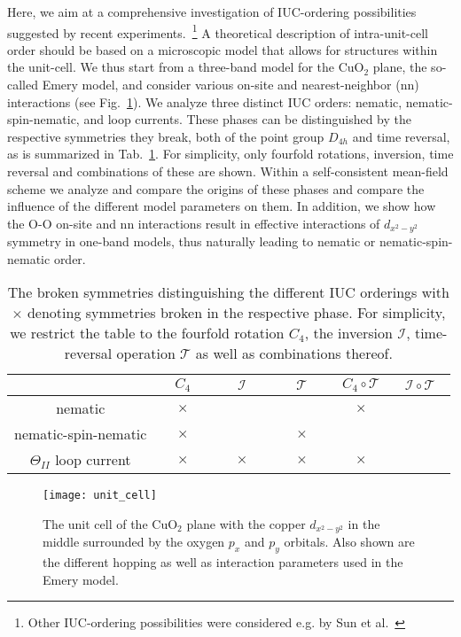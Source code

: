 \documentclass[prb, twocolumn,showpacs,preprintnumbers,amsmath,amssymb, floatfix]{revtex4}
\begin{document}
Here, we aim at a comprehensive investigation of IUC-ordering
possibilities suggested by recent experiments.~\footnote{Other IUC-ordering possibilities were considered e.g. by Sun et al.~\cite{sun:2008}}
A theoretical description of intra-unit-cell order
should be based on a microscopic model
that allows for structures within the unit-cell.
We thus start from a three-band model for the CuO$_2$ plane, the so-called Emery
model\cite{emery:1987}, and consider various on-site and nearest-neighbor (nn) interactions
(see Fig.~\ref{fig:unitcell}).
We analyze three
distinct IUC orders: nematic, nematic-spin-nematic,
 and loop currents.
 These phases can be distinguished by the respective symmetries they break, both of the point group $D_{4h}$ and time reversal, as is summarized in Tab.~\ref{tab:sym}. 
For simplicity, only fourfold rotations, inversion, time reversal and combinations of these are shown. Within a self-consistent mean-field scheme we analyze and compare the origins of these phases and compare the influence
 of the different model parameters on them.
In addition, we show how the O-O on-site and nn interactions result in
effective interactions of $d_{x^2-y^2}$ symmetry in one-band models, thus naturally leading to nematic or nematic-spin-nematic order.
\begin{table}[b!]
  \centering
  \begin{tabular}{c|c|c|c|c|c}
    & $C_4$ & $\mathcal{I}$ & $\mathcal{T}$ & $C_4\circ \mathcal{T}$ & $\mathcal{I}\circ\mathcal{T}$\\
    \hline
    \hline
    nematic &$\quad\times\quad$ & $\quad\phantom{-}\quad$ & $\quad\phantom{-}\quad$ & $\quad\times\quad$ &$\quad\phantom{-}\quad$\\
    \hline
    nematic-spin-nematic &$\times$  &  & $\times$ & $ $ & $ $\\
    \hline
    $\Theta_{II}$ loop current & $\times$ & $\times$ & $\times$ & $\times$ &
  \end{tabular}
  \caption{The broken symmetries distinguishing the different IUC orderings with $\times$ denoting symmetries broken in the respective phase. For simplicity, we restrict the table to the fourfold rotation $C_4$, the inversion $\mathcal{I}$, time-reversal operation $\mathcal{T}$ as well as combinations thereof.}
  \label{tab:sym}
\end{table}

\begin{figure}[b]
  \begin{center}
    \texttt{[image: unit\_cell]}
  \end{center}
  \caption{The unit cell of the CuO$_2$ plane with the copper $d_{x^2-y^2}$ in the middle surrounded by the oxygen $p_x$ and $p_y$ orbitals. Also shown are the different hopping as well as interaction parameters used in the Emery model.}
  \label{fig:unitcell}
\end{figure}
\end{document}
